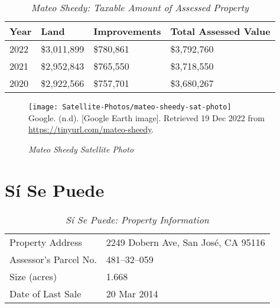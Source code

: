 \begin{table}[hbt]
  \SingleSpacing%
  \caption[Mateo Sheedy: Taxable Amount of Assessed Propery]{\textit{Mateo Sheedy: Taxable Amount of Assessed Property}}\label{tab:mateo-sheedy-taxable-amount}
  \begin{tabular}{llll}
    \toprule
    Year & Land        & Improvements & Total Assessed Value \\
    \midrule
    2022 & \$3,011,899 & \$780,861    & \$3,792,760 \\
    2021 & \$2,952,843 & \$765,550    & \$3,718,550 \\
    2020 & \$2,922,566 & \$757,701    & \$3,680,267 \\
    \bottomrule
  \end{tabular}
\end{table}

\begin{figure}[hbt]
  \caption[Mateo Sheedy Satellite Photo]{\textit{Mateo Sheedy Satellite Photo}}\label{fig:mateo-sheedy-sat-photo}
  \texttt{[image: Satellite-Photos/mateo-sheedy-sat-photo]}\\ %
  \footnotesize{Google. (n.d). [Google Earth image]. Retrieved 19 Dec 2022 from \url{https://tinyurl.com/mateo-sheedy}.}
\end{figure}


\clearpage
\section{Sí Se Puede}\label{sec:sí-se-puede-info}\indent

\begin{table}[htb]
  \SingleSpacing%
  \caption[Sí Se Puede: Property Information]{\textit{Sí Se Puede: Property Information}}\label{tab:sí-se-puede-prop-info}
  \begin{tabular}{ll}
    \toprule
    Property Address      & 2249 Dobern Ave, San José, CA 95116 \\
    Assessor's Parcel No. &  481–32–059 \\
    Size (acres)          &  1.668\\
    Date of Last Sale     &  20 Mar 2014 \\
    \bottomrule
  \end{tabular}
\end{table}


